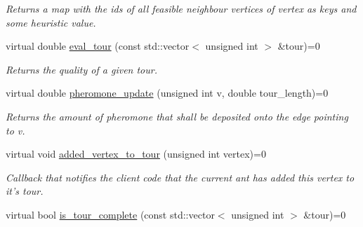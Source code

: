 \begin{CompactItemize}
\begin{CompactList}\small\item\em Returns a map with the ids of all feasible neighbour vertices of vertex as keys and some heuristic value. \item\end{CompactList}\item 
\hypertarget{classOptimizationProblem_7e89680c220a5b45c716127145227034}{
virtual double \hyperlink{classOptimizationProblem_7e89680c220a5b45c716127145227034}{eval\_\-tour} (const std::vector$<$ unsigned int $>$ \&tour)=0}
\label{classOptimizationProblem_7e89680c220a5b45c716127145227034}

\begin{CompactList}\small\item\em Returns the quality of a given tour. \item\end{CompactList}\item 
\hypertarget{classOptimizationProblem_6e6c867caca96eb95606006c4e508ac9}{
virtual double \hyperlink{classOptimizationProblem_6e6c867caca96eb95606006c4e508ac9}{pheromone\_\-update} (unsigned int v, double tour\_\-length)=0}
\label{classOptimizationProblem_6e6c867caca96eb95606006c4e508ac9}

\begin{CompactList}\small\item\em Returns the amount of pheromone that shall be deposited onto the edge pointing to v. \item\end{CompactList}\item 
\hypertarget{classOptimizationProblem_3df069cbd0e948368a5696b21892cb7a}{
virtual void \hyperlink{classOptimizationProblem_3df069cbd0e948368a5696b21892cb7a}{added\_\-vertex\_\-to\_\-tour} (unsigned int vertex)=0}
\label{classOptimizationProblem_3df069cbd0e948368a5696b21892cb7a}

\begin{CompactList}\small\item\em Callback that notifies the client code that the current ant has added this vertex to it's tour. \item\end{CompactList}\item 
\hypertarget{classOptimizationProblem_41c614f3cb6cc0d96fa34adf129ff47f}{
virtual bool \hyperlink{classOptimizationProblem_41c614f3cb6cc0d96fa34adf129ff47f}{is\_\-tour\_\-complete} (const std::vector$<$ unsigned int $>$ \&tour)=0}
\label{classOptimizationProblem_41c614f3cb6cc0d96fa34adf129ff47f}


\end{CompactItemize}
